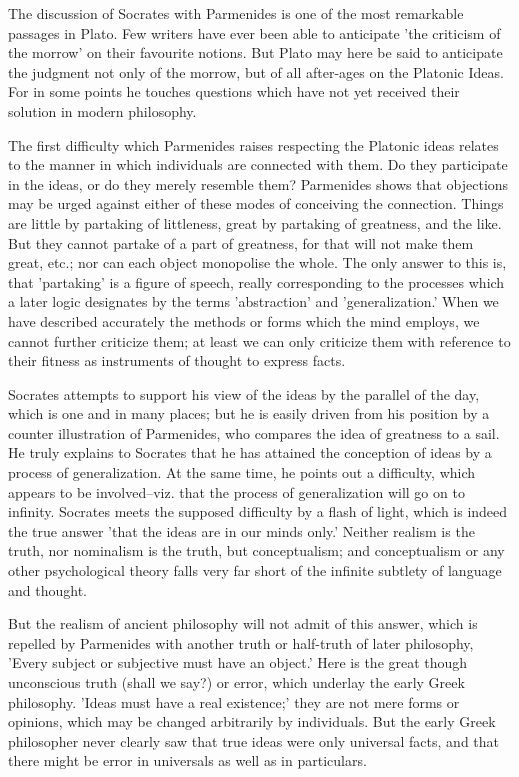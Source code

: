 The discussion of Socrates with Parmenides is one of the most remarkable
passages in Plato. Few writers have ever been able to anticipate 'the
criticism of the morrow' on their favourite notions. But Plato may here
be said to anticipate the judgment not only of the morrow, but of
all after-ages on the Platonic Ideas. For in some points he touches
questions which have not yet received their solution in modern
philosophy.

The first difficulty which Parmenides raises respecting the Platonic
ideas relates to the manner in which individuals are connected with
them. Do they participate in the ideas, or do they merely resemble them?
Parmenides shows that objections may be urged against either of these
modes of conceiving the connection. Things are little by partaking of
littleness, great by partaking of greatness, and the like. But they
cannot partake of a part of greatness, for that will not make them
great, etc.; nor can each object monopolise the whole. The only answer
to this is, that 'partaking' is a figure of speech, really corresponding
to the processes which a later logic designates by the terms
'abstraction' and 'generalization.' When we have described accurately
the methods or forms which the mind employs, we cannot further criticize
them; at least we can only criticize them with reference to their
fitness as instruments of thought to express facts.

Socrates attempts to support his view of the ideas by the parallel of
the day, which is one and in many places; but he is easily driven from
his position by a counter illustration of Parmenides, who compares the
idea of greatness to a sail. He truly explains to Socrates that he has
attained the conception of ideas by a process of generalization. At
the same time, he points out a difficulty, which appears to be
involved--viz. that the process of generalization will go on to
infinity. Socrates meets the supposed difficulty by a flash of light,
which is indeed the true answer 'that the ideas are in our minds
only.' Neither realism is the truth, nor nominalism is the truth, but
conceptualism; and conceptualism or any other psychological theory falls
very far short of the infinite subtlety of language and thought.

But the realism of ancient philosophy will not admit of this answer,
which is repelled by Parmenides with another truth or half-truth of
later philosophy, 'Every subject or subjective must have an object.'
Here is the great though unconscious truth (shall we say?) or error,
which underlay the early Greek philosophy. 'Ideas must have a real
existence;' they are not mere forms or opinions, which may be changed
arbitrarily by individuals. But the early Greek philosopher never
clearly saw that true ideas were only universal facts, and that there
might be error in universals as well as in particulars.

